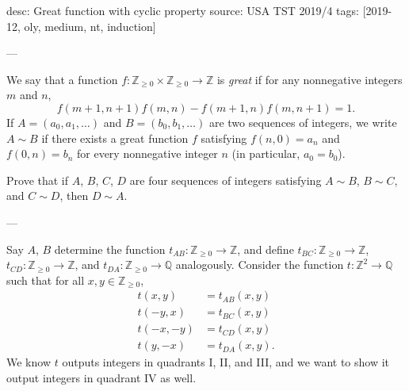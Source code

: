 desc: Great function with cyclic property
source: USA TST 2019/4
tags: [2019-12, oly, medium, nt, induction]

---

We say that a function $f:\mathbb Z_{\ge0}\times\mathbb Z_{\ge0}\to\mathbb Z$ is \emph{great} if for any nonnegative integers $m$ and $n$, \[f(m+1,n+1)f(m,n)-f(m+1,n)f(m,n+1)=1.\]
If $A=(a_0,a_1,\ldots)$ and $B=(b_0,b_1,\ldots)$ are two sequences of integers, we write $A\sim B$ if there exists a great function $f$ satisfying $f(n,0)=a_n$ and $f(0,n)=b_n$ for every nonnegative integer $n$ (in particular, $a_0=b_0$).

Prove that if $A$, $B$, $C$, $D$ are four sequences of integers satisfying $A\sim B$, $B\sim C$, and $C\sim D$, then $D\sim A$.

---

Say $A$, $B$ determine the function $t_{AB}:\mathbb Z_{\ge0}\to\mathbb Z$, and define $t_{BC}:\mathbb Z_{\ge0}\to\mathbb Z$, $t_{CD}:\mathbb Z_{\ge0}\to\mathbb Z$, and $t_{DA}:\mathbb Z_{\ge0}\to\mathbb Q$ analogously. Consider the function $t:\mathbb Z^2\to\mathbb Q$ such that for all $x,y\in\mathbb Z_{\ge0}$,
\begin{align*}
    t(x,y)&=t_{AB}(x,y)\\
    t(-y,x)&=t_{BC}(x,y)\\
    t(-x,-y)&=t_{CD}(x,y)\\
    t(y,-x)&=t_{DA}(x,y).
\end{align*}
We know $t$ outputs integers in quadrants I, II, and III, and we want to show it output integers in quadrant IV as well.

